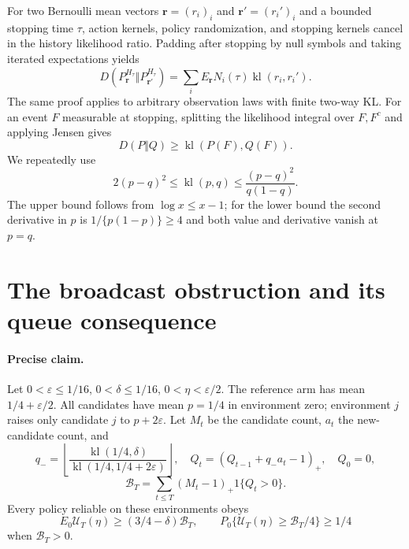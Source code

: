 For two Bernoulli mean vectors $\boldsymbol r=(r_i)_i$ and
$\boldsymbol r'=(r_i')_i$ and a bounded stopping time $\tau$, action
kernels, policy randomization, and stopping kernels cancel in the history
likelihood ratio. Padding after stopping by null symbols and taking iterated
expectations yields
\begin{equation}
 D(P_{\boldsymbol r}^{H_\tau}\Vert P_{\boldsymbol r'}^{H_\tau})
 =\sum_iE_{\boldsymbol r} N_i(\tau)\operatorname{kl}(r_i,r_i').
 \label{eq:app_kl_identity}
\end{equation}
The same proof applies to arbitrary observation laws with finite two-way KL.
For an event $F$ measurable at stopping, splitting the likelihood integral
over $F,F^c$ and applying Jensen gives
\[
 D(P\Vert Q)\ge\operatorname{kl}(P(F),Q(F)).
\]
We repeatedly use
\[
 2(p-q)^2\le\operatorname{kl}(p,q)
 \le\frac{(p-q)^2}{q(1-q)}.
\]
The upper bound follows from $\log x\le x-1$; for the lower bound the second
derivative in $p$ is $1/\{p(1-p)\}\ge4$ and both value and derivative vanish
at $p=q$.

\section{The broadcast obstruction and its queue consequence}
\label{app:broadcast}

\paragraph{Precise claim.}
Let $0<\varepsilon\le1/16$, $0<\delta\le1/16$,
$0<\eta<\varepsilon/2$. The reference arm has mean
$1/4+\varepsilon/2$. All candidates have mean $p=1/4$ in environment zero;
environment $j$ raises only candidate $j$ to $p+2\varepsilon$. Let $M_t$ be
the candidate count, $a_t$ the new-candidate count, and
\[
 q_- =\left\lfloor\frac{\operatorname{kl}(1/4,\delta)}
                         {\operatorname{kl}(1/4,1/4+2\varepsilon)}\right\rfloor,
 \quad Q_t=(Q_{t-1}+q_-a_t-1)_+,\quad Q_0=0,
\]
\[
 \mathcal B_T=\sum_{t\le T}(M_t-1)_+1\{Q_t>0\}.
\]
Every policy reliable on these environments obeys
\[
 E_0\mathcal U_T(\eta)\ge(3/4-\delta)\mathcal B_T,
 \qquad
 P_0\{\mathcal U_T(\eta)\ge\mathcal B_T/4\}\ge1/4
\]
when $\mathcal B_T>0$.

